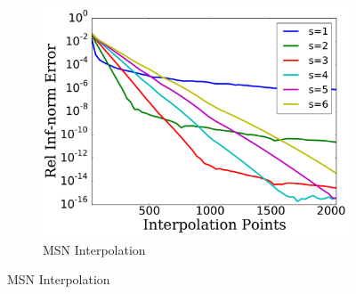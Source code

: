 
\begin{figure}[p]
    \centering
    \begin{subfigure}{0.45\textwidth}
    \includegraphics[width=\textwidth]{plots/msn_interp_fast_2n_rough_heaviside_2.pdf}
    \caption{MSN Interpolation}
    \end{subfigure}


\end{figure}
